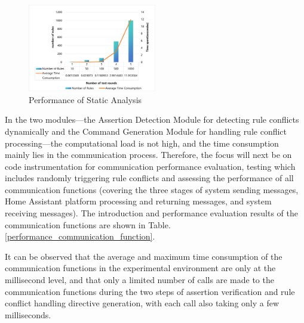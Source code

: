 \begin{figure}[htbp]
	\caption{Performance of Static Analysis}
	\label{performance_static_analysis}
	\includegraphics[width=0.5\textwidth]{figure/performance.png}
	
\end{figure}

In the two modules—the Assertion Detection Module for detecting rule conflicts dynamically and the Command Generation Module for handling rule conflict processing—the computational load is not high, and the time consumption mainly lies in the communication process. Therefore, the focus will next be on code instrumentation for communication performance evaluation, testing which includes randomly triggering rule conflicts and assessing the performance of all communication functions (covering the three stages of system sending messages, Home Assistant platform processing and returning messages, and system receiving messages). The introduction and performance evaluation results of the communication functions are shown in Table.\ref{performance_communication_function}.

It can be observed that the average and maximum time consumption of the communication functions in the experimental environment are only at the millisecond level, and that only a limited number of calls are made to the communication functions during the two steps of assertion verification and rule conflict handling directive generation, with each call also taking only a few milliseconds.

